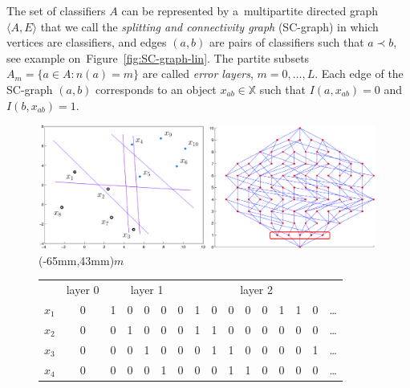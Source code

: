 \documentclass{article} %
\def\XX{\mathbb{X}}
\begin{document}

The set of classifiers $A$ can be represented by
a~multipartite directed graph $\langle A, E \rangle$
that we call the \emph{splitting and connectivity graph} (SC-graph)
in which vertices are classifiers, and
edges $(a,b)$ are pairs of classifiers such that $a\prec b$,
see example on~Figure~\ref{fig:SC-graph-lin}.
The partite subsets $A_m = \{ a\in A\colon n(a)=m \}$
are called \emph{error layers}, $m=0,\ldots,L$.
Each edge of the SC-graph $(a,b)$ corresponds to an object $x_{ab}\in\XX$
such that $I(a,x_{ab})=0$ and $I(b,x_{ab})=1$.

\begin{figure}[t]
    \noindent\centering
    \includegraphics[width = 55mm]{SimpleSample1num.PNG.eps}
    \qquad
    \includegraphics[width = 55mm]{SimpleGraph1.PNG.eps}
    \XYtext(-65mm,43mm){\scriptsize{$m$}}%
    \\\medskip
    \scriptsize
    \begin{tabular}{c|c|ccccc|cccccccc|c}
        & {layer 0} &
        \multicolumn{5}{c|}{layer 1} &
        \multicolumn{8}{c|}{layer 2} \\
        $x_1$ & 0 & 1 & 0 & 0 & 0 & 0 & 1 & 0 & 0 & 0 & 0 & 1 & 1 & 0 & \ldots \\[-0.6ex]
        $x_2$ & 0 & 0 & 1 & 0 & 0 & 0 & 1 & 1 & 0 & 0 & 0 & 0 & 0 & 0 & \ldots \\[-0.6ex]
        $x_3$ & 0 & 0 & 0 & 1 & 0 & 0 & 0 & 1 & 1 & 0 & 0 & 0 & 0 & 1 & \ldots \\[-0.6ex]
        $x_4$ & 0 & 0 & 0 & 0 & 1 & 0 & 0 & 0 & 1 & 1 & 0 & 0 & 0 & 0 & \ldots \\[-0.6ex]

\end{tabular}
\end{figure}
\end{document}
